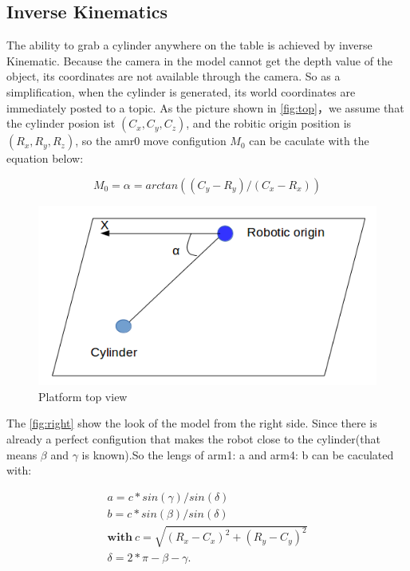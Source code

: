\subsection{Inverse Kinematics}

The ability to grab a cylinder anywhere on the table is achieved by inverse Kinematic. Because the camera in the model cannot get the depth value of the object, its coordinates are not available through the camera. So as a simplification, when the cylinder is generated, its world coordinates are immediately posted to a topic. As the picture shown in \autoref{fig:top}，we assume that the cylinder posion ist $(C_x, C_y, C_z)$, and the robitic origin position is  $(R_x, R_y, R_z)$, so the amr0 move configution $M_0$ can be caculate with the equation below:


\begin{equation}
\label{simple_equation}
M_0=\alpha = arctan((C_y-R_y)/(C_x-R_x))
\end{equation}









\begin{figure}[htpb]
\centering
	\includegraphics[width=0.96\linewidth]{figures/3.png} 
	\caption{Platform top view}
	\vspace{-0.4cm}
	\label{fig:top}
\end{figure}


The \autoref{fig:right} show the look of the model from the right side. Since there is already a perfect configution that makes the robot close to the cylinder(that means $\beta$ and $\gamma$ is known).So the lengs of arm1: a and arm4: b can be caculated with:

\begin{equation}
\begin{aligned}
a=c*sin(\gamma)/sin(\delta)\\b=c*sin(\beta)/sin(\delta)\\ 
\textbf{with}\ c=\sqrt{(R_x-C_x)^2+(R_y-C_y)^2}\\\delta=2*\pi-\beta-\gamma.
\end{aligned}
\end{equation}



